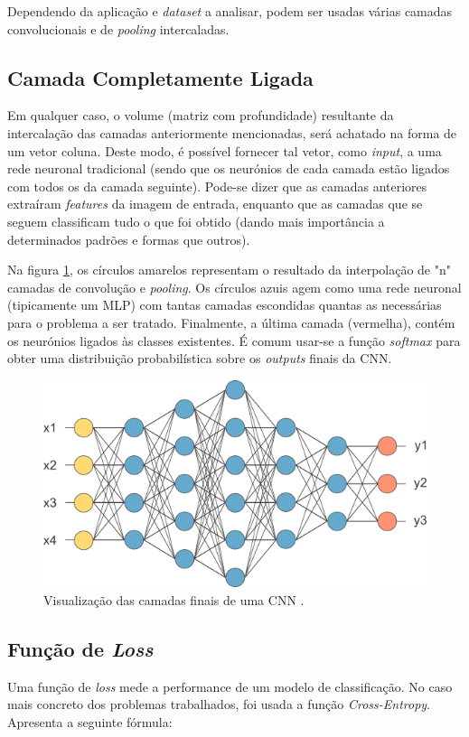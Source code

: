 \noindent Dependendo da aplicação e \textit{dataset} a analisar, podem ser usadas várias camadas convolucionais e de \textit{pooling} intercaladas.

\subsection{Camada Completamente Ligada}
\label{chap2:subsec:fully}
Em qualquer caso, o volume (matriz com profundidade) resultante da intercalação das camadas anteriormente mencionadas, será achatado na forma de um vetor coluna. Deste modo, é possível fornecer tal vetor, como \textit{input}, a uma rede neuronal tradicional (sendo que os neurónios de cada camada estão ligados com todos os da camada seguinte). Pode-se dizer que as camadas anteriores extraíram \textit{features} da imagem de entrada, enquanto que as camadas que se seguem classificam tudo o que foi obtido (dando mais importância a determinados padrões e formas que outros).

\noindent Na figura \ref{fig:fully}, os círculos amarelos representam o resultado da interpolação de "n" camadas de convolução e \textit{pooling}. Os círculos azuis agem como uma rede neuronal (tipicamente um \ac{MLP}) com tantas camadas escondidas quantas as necessárias para o problema a ser tratado. Finalmente, a última camada (vermelha), contém os neurónios ligados às classes existentes. É comum usar-se a função \textit{softmax} para obter uma distribuição probabilística sobre os \textit{outputs} finais da CNN.\newline

\begin{figure}[h]
\centering
\includegraphics[width=330pt]{fully.png}
\caption{Visualização das camadas finais de uma CNN \cite{fully}.}
\label{fig:fully}
\end{figure}

\subsection{Função de \textit{Loss}}
\label{chap2:subsec:loss}
Uma função de \textit{loss} mede a performance de um modelo de classificação. No caso mais concreto dos problemas trabalhados, foi usada a função \textit{Cross-Entropy}. Apresenta a seguinte fórmula:

